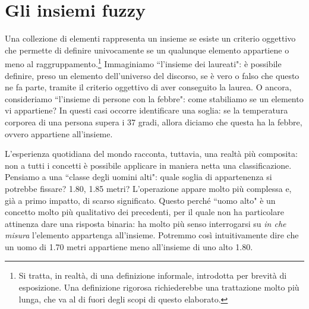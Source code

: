 \documentclass[12pt,a4paper]{report}
\begin{document}
\section{Gli insiemi fuzzy}

Una collezione di elementi rappresenta un insieme se esiste un criterio oggettivo che permette di definire univocamente se un qualunque elemento appartiene o meno al raggruppamento.\footnote{Si tratta, in realtà, di una definizione informale, introdotta per brevità di esposizione. Una definizione rigorosa richiederebbe una trattazione molto più lunga, che va al di fuori degli scopi di questo elaborato.}
Immaginiamo ``l'insieme dei laureati": è possibile definire, preso un elemento dell'universo del discorso,  se è vero o falso che questo ne fa parte, tramite il criterio oggettivo di aver conseguito la laurea. O ancora, consideriamo  ``l'insieme di persone con la febbre": come stabiliamo se un elemento vi appartiene?
In questi casi occorre identificare una soglia: se la temperatura corporea di una persona supera i 37 gradi, allora diciamo che questa ha la febbre, ovvero appartiene all'insieme.

L'esperienza quotidiana del mondo racconta, tuttavia, una realtà più composita: non a tutti i concetti è possibile applicare in maniera netta una classificazione.
Pensiamo a una ``classe degli uomini alti"\cite{fuzzysetspaper}: quale soglia di appartenenza si potrebbe fissare? 1.80, 1.85 metri? 
L'operazione appare molto più complessa e, già a primo impatto, di scarso significato. Questo perché ``uomo alto" è un concetto molto più qualitativo dei precedenti, per il quale non ha particolare attinenza dare una risposta binaria: ha molto più senso interrogarsi su \emph{in che misura} l'elemento appartenga all'insieme. Potremmo così intuitivamente dire che un uomo di 1.70 metri appartiene meno all'insieme di uno alto 1.80.
\end{document}
